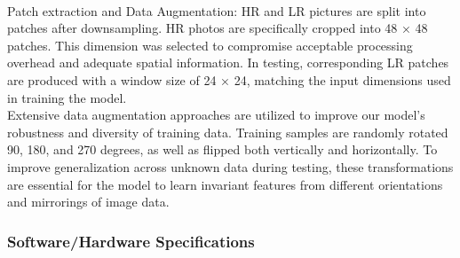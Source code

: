 \documentclass[twocolumn]{svjour3}          %
\begin{document}
\\
Patch extraction and Data Augmentation: HR and LR pictures are split into patches after downsampling. HR photos are specifically cropped into 48 × 48 patches. This dimension was selected to compromise acceptable processing overhead and adequate spatial information. In testing, corresponding LR patches are produced with a window size of 24 × 24, matching the input dimensions used in training the model.\\
Extensive data augmentation approaches are utilized to improve our model's robustness and diversity of training data. Training samples are randomly rotated 90, 180, and 270 degrees, as well as flipped both vertically and horizontally. To improve generalization across unknown data during testing, these transformations are essential for the model to learn invariant features from different orientations and mirrorings of image data.

\subsubsection{Software/Hardware Specifications}
\end{document}
